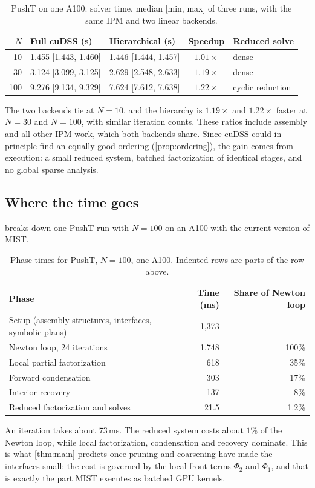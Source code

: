 \begin{table}[htbp]
\centering
\caption{PushT on one A100: solver time, median [min, max] of three runs, with the
same IPM and two linear backends.}
\label{tab:cudss}
\small
\begin{tabular}{@{}rllcl@{}}
\toprule
$N$ & Full cuDSS (s) & Hierarchical (s) & Speedup & Reduced solve\\
\midrule
10  & 1.455 [1.443, 1.460] & 1.446 [1.444, 1.457] & $1.01\times$ & dense\\
30  & 3.124 [3.099, 3.125] & 2.629 [2.548, 2.633] & $1.19\times$ & dense\\
100 & 9.276 [9.134, 9.329] & 7.624 [7.612, 7.638] & $1.22\times$ & cyclic reduction\\
\bottomrule
\end{tabular}
\end{table}

The two backends tie at $N=10$, and the hierarchy is $1.19\times$ and
$1.22\times$ faster at $N=30$ and $N=100$, with similar iteration counts. These
ratios include assembly and all other IPM work, which both backends share. Since
cuDSS could in principle find an equally good ordering (\cref{prop:ordering}),
the gain comes from execution: a small reduced system, batched factorization of
identical stages, and no global sparse analysis.

\subsection{Where the time goes}\label{sec:phases}

 breaks down one PushT run with $N=100$ on an A100 with the
current version of MIST.

\begin{table}[htbp]
\centering
\caption{Phase times for PushT, $N=100$, one A100. Indented rows are parts of the
row above.}
\label{tab:phases}
\small
\begin{tabular}{@{}lrr@{}}
\toprule
Phase & Time (ms) & Share of Newton loop\\
\midrule
Setup (assembly structures, interfaces, symbolic plans) & 1{,}373 & --\\
Newton loop, 24 iterations & 1{,}748 & 100\%\\
\quad Local partial factorization & 618 & 35\%\\
\quad Forward condensation & 303 & 17\%\\
\quad Interior recovery & 137 & 8\%\\
\quad Reduced factorization and solves & 21.5 & 1.2\%\\
\bottomrule
\end{tabular}
\end{table}

An iteration takes about 73\,ms. The reduced system costs about $1\%$ of the
Newton loop, while local factorization, condensation and recovery dominate. This
is what \cref{thm:main} predicts once pruning and coarsening have made the
interfaces small: the cost is governed by the local front terms $\Phi_2$ and
$\Phi_1$, and that is exactly the part MIST executes as batched GPU kernels.
